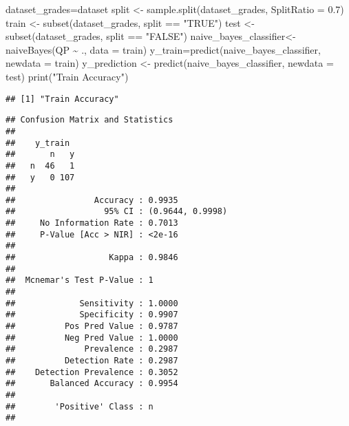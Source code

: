 \documentclass[
]{article}
\newenvironment{Shaded}{\begin{snugshade}}{\end{snugshade}}
\newcommand{\AttributeTok}[1]{\textcolor[rgb]{0.77,0.63,0.00}{#1}}
\newcommand{\FloatTok}[1]{\textcolor[rgb]{0.00,0.00,0.81}{#1}}
\newcommand{\FunctionTok}[1]{\textcolor[rgb]{0.00,0.00,0.00}{#1}}
\newcommand{\NormalTok}[1]{#1}
\newcommand{\OtherTok}[1]{\textcolor[rgb]{0.56,0.35,0.01}{#1}}
\newcommand{\SpecialCharTok}[1]{\textcolor[rgb]{0.00,0.00,0.00}{#1}}
\newcommand{\StringTok}[1]{\textcolor[rgb]{0.31,0.60,0.02}{#1}}
\begin{document}
\begin{Shaded}
\begin{Highlighting}[]
\NormalTok{dataset\_grades}\OtherTok{=}\NormalTok{dataset}
\NormalTok{split }\OtherTok{\textless{}{-}} \FunctionTok{sample.split}\NormalTok{(dataset\_grades, }\AttributeTok{SplitRatio =} \FloatTok{0.7}\NormalTok{) }
\NormalTok{train }\OtherTok{\textless{}{-}} \FunctionTok{subset}\NormalTok{(dataset\_grades, split }\SpecialCharTok{==} \StringTok{"TRUE"}\NormalTok{) }
\NormalTok{test }\OtherTok{\textless{}{-}} \FunctionTok{subset}\NormalTok{(dataset\_grades, split }\SpecialCharTok{==} \StringTok{"FALSE"}\NormalTok{) }
\NormalTok{naive\_bayes\_classifier}\OtherTok{\textless{}{-}} \FunctionTok{naiveBayes}\NormalTok{(QP }\SpecialCharTok{\textasciitilde{}}\NormalTok{ ., }\AttributeTok{data =}\NormalTok{ train)}
\NormalTok{y\_train}\OtherTok{=}\FunctionTok{predict}\NormalTok{(naive\_bayes\_classifier, }\AttributeTok{newdata =}\NormalTok{ train)}
\NormalTok{y\_prediction }\OtherTok{\textless{}{-}} \FunctionTok{predict}\NormalTok{(naive\_bayes\_classifier, }\AttributeTok{newdata =}\NormalTok{ test)}
\FunctionTok{print}\NormalTok{(}\StringTok{"Train Accuracy"}\NormalTok{)}
\end{Highlighting}
\end{Shaded}

\begin{verbatim}
## [1] "Train Accuracy"
\end{verbatim}

\begin{Shaded}
\end{Shaded}

\begin{verbatim}
## Confusion Matrix and Statistics
## 
##    y_train
##       n   y
##   n  46   1
##   y   0 107
##                                           
##                Accuracy : 0.9935          
##                  95% CI : (0.9644, 0.9998)
##     No Information Rate : 0.7013          
##     P-Value [Acc > NIR] : <2e-16          
##                                           
##                   Kappa : 0.9846          
##                                           
##  Mcnemar's Test P-Value : 1               
##                                           
##             Sensitivity : 1.0000          
##             Specificity : 0.9907          
##          Pos Pred Value : 0.9787          
##          Neg Pred Value : 1.0000          
##              Prevalence : 0.2987          
##          Detection Rate : 0.2987          
##    Detection Prevalence : 0.3052          
##       Balanced Accuracy : 0.9954          
##                                           
##        'Positive' Class : n               
## 
\end{verbatim}
\end{document}
